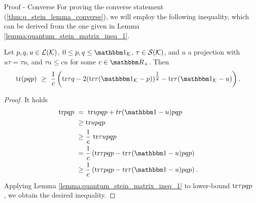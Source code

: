   \begin{subsection}{Proof - Converse}
  For proving the converse statement (\ref{thm:q_stein_lemma_converse}), we will employ the following inequality, which can be derived from the one given in Lemma \ref{lemma:quantum_stein_matrix_ineq_1}.
  \begin{lemma}\label{lemma:quantum_stein_matrix_ineq_2}
   Let $p,q,u \in {\mathcal L}({\mathcal K})$, $0 \leq p,q \leq \bbmeins_\cK$, $\tau \in {\mathcal S}({\mathcal K})$, and $u$ a projection with $u\tau = \tau u$, and $\tau u \leq c u$ for some $c \in \bbmR_+$. Then 
   \begin{align*}
    \tr(pqp) \ \geq \ \frac{1}{c} \left( \tr \tau q  - 2 (\tr \tau(\bbmeins_\cK - p))^{\tfrac{1}{2}} - \tr \tau (\bbmeins_\cK - u)\right).
   \end{align*}
  \end{lemma}
  \begin{proof}
   It holds
   \begin{align*}
    \tr pqp \ 
    &= \ \tr upqp + tr (\bbmeins - u) pqp  \\
    &\geq \tr upqp \\ 
    &\geq \frac{1}{c} \ \tr \tau upqp \\
    & = \frac{1}{c} \left(\tr \tau pqp  - \tr \tau (\bbmeins -u) pqp \right) \\
    & \geq \frac{1}{c} \left(\tr \tau pqp  - \tr \tau (\bbmeins -u) pqp \right).
   \end{align*}
    Applying Lemma \ref{lemma:quantum_stein_matrix_ineq_1} to lower-bound $\mathrm{tr} \tau pqp$, we obtain the desired inequality.
  \end{proof}


\end{subsection}
